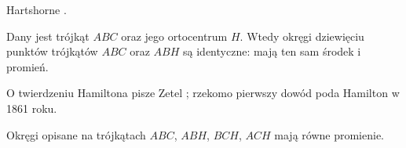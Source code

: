 Hartshorne \cite[s. 58]{hartshorne2000}.

\begin{theorem}[Hamiltona]
	Dany jest trójkąt $ABC$ oraz jego ortocentrum $H$.
	Wtedy okręgi dziewięciu punktów trójkątów $ABC$ oraz $ABH$ są identyczne: mają ten sam środek i promień.
\end{theorem}

O twierdzeniu Hamiltona pisze Zetel \cite[s. 65]{zetel_2020}; rzekomo pierwszy dowód poda Hamilton w 1861 roku.

\begin{corollary}
	Okręgi opisane na trójkątach $ABC$, $ABH$, $BCH$, $ACH$ mają równe promienie.
\end{corollary}

%